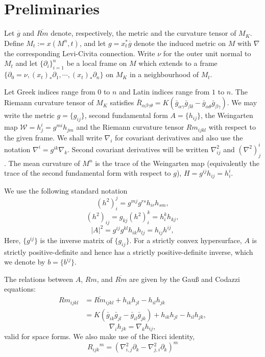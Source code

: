\documentclass{amsart}
\theoremstyle{definition}
\theoremstyle{remark}
\numberwithin{equation}{section}
\begin{document}
\section{Preliminaries}

Let $\overline{g}$ and $\overline{Rm}$ denote, respectively, the metric and the curvature tensor of $M_K$. Define \(M_t := x(M^n,t)\), and let \(g = x_t^{\ast} \overline{g}\) denote the induced metric on \(M\) with $\nabla$ the corresponding Levi-Civita connection. Write $\nu$ for the outer unit normal to $M_t$ and let \(\{\partial_i\}_{i=1}^n\) be a local frame on \(M\) which extends to a frame \(\{\partial_0 = \nu, (x_t)_{\ast} \partial_1, \cdots, (x_t)_{\ast} \partial_n\}\) on \(M_K\) in a neighbourhood of \(M_t\). 

Let Greek indices range from \(0\) to \(n\) and Latin indices range from \(1\) to \(n\). The Riemann curvature tensor of \(M_K\) satisfies \(\bar{R}_{\alpha\beta\gamma\theta} = K(\bar{g}_{\alpha\gamma}\bar{g}_{\beta\delta} - \bar{g}_{\alpha\theta}\bar{g}_{\beta\gamma})\). We may write the metric $g = \{g_{ij}\}$, second fundamental form $A = \{h_{ij}\}$, the Weingarten map $\mathcal{W} = h^i_j = g^{mi} h_{jm}$ and the Riemann curvature tensor $Rm_{ijkl}$ with respect to the given frame. We shall write \(\nabla_i\) for covariant derivatives and also use the notation \(\nabla^i = g^{ik} \nabla_k\). Second covariant derivatives will be written \(\nabla^2_{ij}\) and \((\nabla^2)^i_j\). The mean curvature of $M^n$ is the trace of the Weingarten map (equivalently the trace of the second fundamental form with respect to $g$), $H = g^{ij}h_{ij} = h^i_i$.

We use the following standard notation
\[
(h^2)_i^j = g^{mj}g^{rs}h_{ir}h_{sm},
\]
\[
(h^2)_{ij} = g_{kj} (h^2)_i^k = h^k_i h_{kj},
\]
\[
|A|^2 = g^{ij}g^{kl}h_{ik}h_{lj} = h_{ij}h^{ij},
\]
Here, $\{g^{ij}\}$ is the inverse matrix of $\{g_{ij}\}.$ For a strictly convex hypersurface, \(A\) is strictly positive-definite and hence has a strictly positive-definite inverse, which we denote by \(b = \{b^{ij}\}\).

The relations between $A$, $Rm$, and $\overline{Rm}$ are given by the Gau{\ss} and Codazzi equations:
\[
\begin{split}
Rm_{ijkl} &= \overline{Rm}_{ijkl} + h_{ik}h_{jl} - h_{il}h_{jk} \\
&= K(\bar{g}_{ik}\bar{g}_{jl} - \bar{g}_{il}\bar{g}_{jk}) + h_{ik}h_{jl} - h_{il}h_{jk},
\end{split}
\]
\[
\nabla_i h_{jk} = \nabla_k h_{ij},
\]
valid for space forms. We also make use of the Ricci identity,
\[
{R_{ijk}}^m  = \left(\nabla^2_{i, j} \partial_k - \nabla^2_{j,i} \partial_k\right)^m
\]
\end{document}
